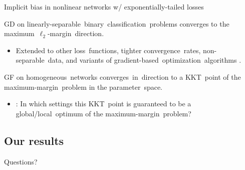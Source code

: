 \documentclass[handout,usenames,dvipsnames]{beamer} %
\begin{document}
\begin{frame}{Implicit bias in nonlinear networks w/ exponentially-tailed losses}
    \begin{exampleblock}{\cite{soudry2018implicit}}
         GD on linearly-separable~binary~classification~problems converges to the maximum~$\ell_2$-margin~direction.
    \end{exampleblock}
    \pause
    \begin{itemize}
        \item Extended to other loss~functions, tighter convergence~rates, non-separable~data, and variants of gradient-based~optimization~algorithms \citep{nacson2019convergence,ji2018risk,ji2020gradient,gunasekar2018characterizing,shamir2021gradient,ji2021characterizing}.
    \end{itemize}
    \pause
    \begin{exampleblock}{\cite{lyu2019gradient,ji2020directional}}
          GF on homogeneous~networks converges~in~direction to a KKT~point of the maximum-margin~problem in the parameter~space.
    \end{exampleblock}
    \pause
    \begin{itemize}
        \item \cite{vardi2021margin}: In which settings this KKT~point is guaranteed to be a global/local~optimum of the maximum-margin~problem?
    \end{itemize}
    
\end{frame}



\subsection{Our results}



\begin{frame}{Questions?}
\end{frame}
\end{document}
